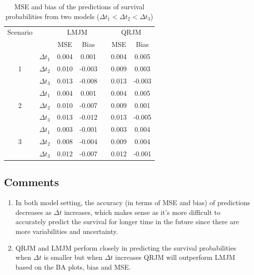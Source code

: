 \documentclass{article}
\begin{document}
\begin{table}[H]
\centering
\caption{MSE and bias of the predictions of survival probabilities from two models ($\Delta t_1<\Delta t_2<\Delta t_3$)}
\begin{tabular}{ccccccc}
\hline
Scenario & & \multicolumn{2}{c}{LMJM} & & \multicolumn{2}{c}{QRJM} \\
\cline{3-4}\cline{6-7}
 & & MSE & Bias & & MSE & Bias \\
\hline
\multirow{3}{*}{1} & $\Delta t_1$ & 0.004 & 0.001  & & 0.004 & 0.005 \\
& $\Delta t_2$ & 0.010 & -0.003 & & 0.009 & 0.003 \\
& $\Delta t_3$ & 0.013 & -0.008 & & 0.013 & -0.003 \\
\hline
\multirow{3}{*}{2} & $\Delta t_1$ & 0.004 & 0.001 & & 0.004 & 0.005 \\
& $\Delta t_2$ & 0.010 & -0.007 & & 0.009 & 0.001 \\
& $\Delta t_3$ & 0.013 & -0.012 & & 0.013 & -0.005 \\
\hline
\multirow{3}{*}{3} & $\Delta t_1$ & 0.003 & -0.001 & & 0.003 & 0.004 \\
& $\Delta t_2$ & 0.008 & -0.004 & & 0.009 & 0.004 \\
& $\Delta t_3$ & 0.012 & -0.007 & & 0.012 & -0.001 \\
\hline
\end{tabular}
\end{table}





\subsection{Comments}
\begin{enumerate}
\item In both model setting, the accuracy (in terms of MSE and bias) of predictions decreases as $\Delta t$ increases, which makes sense as it's more difficult to accurately predict the survival for longer time in the future since there are more variabilities and uncertainty.
\item QRJM and LMJM perform closely in predicting the survival probabilities when $\Delta t$ is smaller but when $\Delta t$ increases QRJM will outperform LMJM based on the BA plots, bias and MSE.
\end{enumerate}
\end{document}
